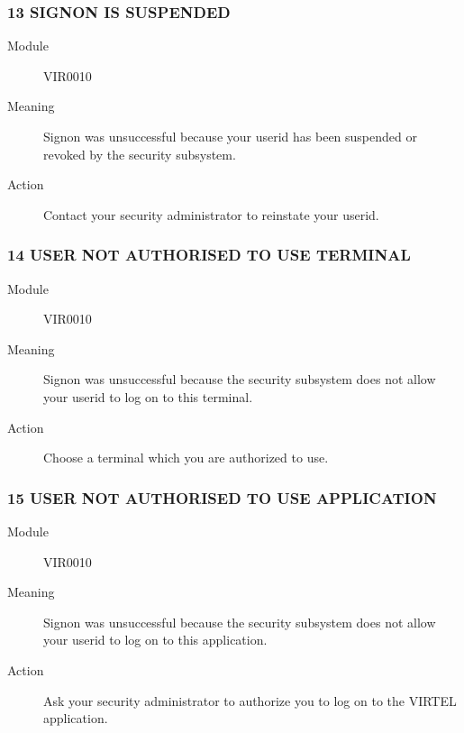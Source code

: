 \documentclass[letterpaper,10pt,english]{sphinxmanual}
\begin{document}
\subsubsection{13 SIGNON IS SUSPENDED}
\label{\detokenize{messages:signon-is-suspended}}\begin{description}
\item[{Module}] \leavevmode
VIR0010

\item[{Meaning}] \leavevmode
Signon was unsuccessful because your userid has been suspended or revoked by the security subsystem.

\item[{Action}] \leavevmode
Contact your security administrator to reinstate your userid.

\end{description}


\subsubsection{14 USER NOT AUTHORISED TO USE TERMINAL}
\label{\detokenize{messages:user-not-authorised-to-use-terminal}}\begin{description}
\item[{Module}] \leavevmode
VIR0010

\item[{Meaning}] \leavevmode
Signon was unsuccessful because the security subsystem does not allow your userid to log on to this terminal.

\item[{Action}] \leavevmode
Choose a terminal which you are authorized to use.

\end{description}


\subsubsection{15 USER NOT AUTHORISED TO USE APPLICATION}
\label{\detokenize{messages:user-not-authorised-to-use-application}}\begin{description}
\item[{Module}] \leavevmode
VIR0010

\item[{Meaning}] \leavevmode
Signon was unsuccessful because the security subsystem does not allow your userid to log on to this application.

\item[{Action}] \leavevmode
Ask your security administrator to authorize you to log on to the VIRTEL application.

\end{description}
\end{document}
